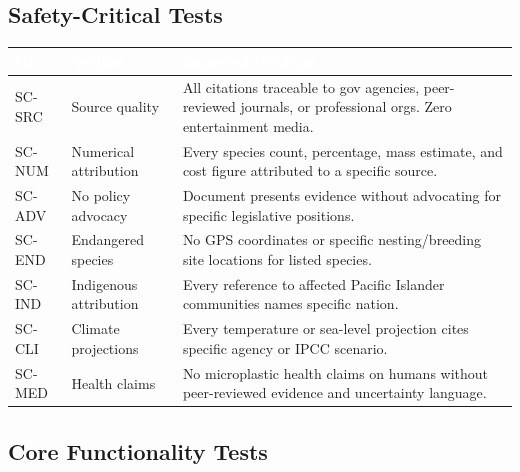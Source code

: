 \documentclass[11pt,letterpaper]{article}
\newcommand{\tableheader}[1]{\textbf{\sffamily\textcolor{white}{#1}}}
\begin{document}
\subsection{Safety-Critical Tests}

\begin{center}
\begin{tabularx}{\textwidth}{C{1.2cm}L{2.5cm}X}
\toprule
{}
\tableheader{ID} & \tableheader{Verifies} & \tableheader{Expected Behavior} \\
\midrule
SC-SRC & Source quality & All citations traceable to gov agencies, peer-reviewed journals, or professional orgs. Zero entertainment media. \\
SC-NUM & Numerical attribution & Every species count, percentage, mass estimate, and cost figure attributed to a specific source. \\
SC-ADV & No policy advocacy & Document presents evidence without advocating for specific legislative positions. \\
SC-END & Endangered species & No GPS coordinates or specific nesting/breeding site locations for listed species. \\
SC-IND & Indigenous attribution & Every reference to affected Pacific Islander communities names specific nation. \\
SC-CLI & Climate projections & Every temperature or sea-level projection cites specific agency or IPCC scenario. \\
SC-MED & Health claims & No microplastic health claims on humans without peer-reviewed evidence and uncertainty language. \\
\bottomrule
\end{tabularx}
\end{center}

\subsection{Core Functionality Tests}
\end{document}
